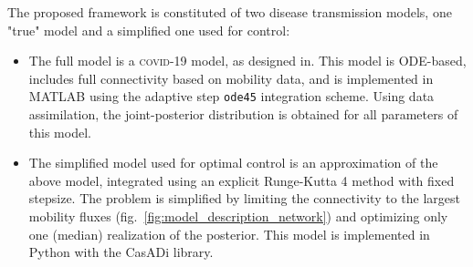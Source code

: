 The proposed framework is constituted of two disease transmission models, one "true" model and a simplified one used for control:
\begin{itemize}
    \item The full model is a \textsc{covid}-19 model, as designed in\cite{Gatto:SpreadDynamicsCOVID19:2020, Bertuzzo:GeographyCOVID19Spread:2020}. This model is ODE-based, includes full connectivity based on mobility data, and is implemented in MATLAB using the adaptive step \verb|ode45| integration scheme. Using data assimilation, the joint-posterior distribution is obtained for all parameters of this model. 
    \item The simplified model used for optimal control is an approximation of the above model, integrated using an explicit Runge-Kutta 4 method with fixed stepsize. The problem is simplified by limiting the connectivity to the largest mobility fluxes (fig.~\ref{fig:model_description_network}) and optimizing only one (median) realization of the posterior. This model is implemented in Python with the CasADi library.
\end{itemize}

